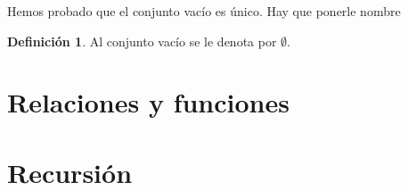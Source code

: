 \documentclass{book}
\theoremstyle{definition}
\newtheorem{df}{Definición}[chapter]
\begin{document}
Hemos probado que el conjunto vacío es único. Hay que ponerle nombre
\begin{df}
	Al conjunto vacío se le denota por $\emptyset$.
\end{df}






\section{Relaciones y funciones}
















\section{Recursión}
	





\end{document}
